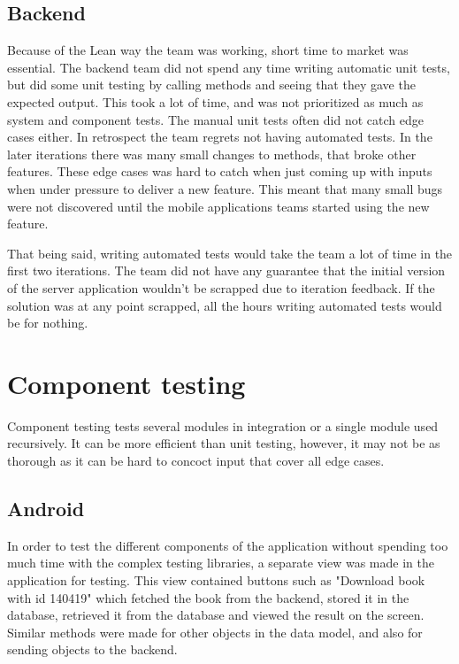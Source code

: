 \subsection{Backend}
Because of the Lean way the team was working, short time to market was essential. The \gls{backend} team did not spend any time writing automatic unit tests, but did some unit testing by calling methods and seeing that they gave the expected output. This took a lot of time, and was not prioritized as much as system and component tests. The manual unit tests often did not catch edge cases either. In retrospect the team regrets not having automated tests. In the later iterations there was many small changes to methods, that broke other features. These edge cases was hard to catch when just coming up with inputs when under pressure to deliver a new feature. This meant that many small bugs were not discovered until the mobile applications teams started using the new feature.

That being said, writing automated tests would take the team a lot of time in the first two iterations. The team did not have any guarantee that the initial version of the server application wouldn't be scrapped due to iteration feedback. If the solution was at any point scrapped, all the hours writing automated tests would be for nothing.

\section{Component testing}
Component testing tests several modules in integration or a single module used recursively. \cite[p. 216-218]{progark} It can be more efficient than unit testing, however, it may not be as thorough as it can be hard to concoct input that cover all edge cases. 

\subsection{Android}
In order to test the different components of the application without spending too much time with the complex testing libraries, a separate view was made in the application for testing. This view contained buttons such as "Download book with id 140419" which fetched the book from the \gls{backend}, stored it in the database, retrieved it from the database and viewed the result on the screen. Similar methods were made for other objects in the data model, and also for sending objects to the \gls{backend}. 

